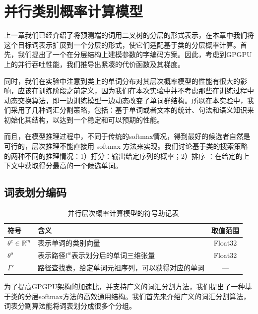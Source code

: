 \chapter{并行类别概率计算模型}
上一章我们已经介绍了将预测端的词用二叉树的分层的形式表示，在本章中我们将这个目标词表示扩展到一个分层的形式，使它们适配基于类的分层概率计算。首先，我们提出了一个在分层结构上建模参数的字编码方案。因此，考虑到GPGPU上的并行吞吐性能，我们推导出紧凑的代价函数及其梯度。

同时，我们在实验中注意到类上的单词分布对其层次概率模型的性能有很大的影响，应该在训练阶段之前定义，因为我们在本次实验中并不考虑那些在训练过程中动态交换算法，即一边训练模型一边动态改变了单词群结构。所以在本实验中，我们采用了几种词汇分割策略，包括：基于单词或者文本的统计、句法和语义知识来初始化其结构，以达到一个稳定和可以预期的性能。

而且，在模型推理过程中，不同于传统的softmax情况，得到最好的候选者自然是可行的，层次推理不能直接用 softmax 方法来实现。我们讨论基于类的搜索策略的两种不同的推理情况：1）打分：输出给定序列的概率；2）排序   ：在给定的上下文中获取得分最高的一个候选单词。


\section{词表划分编码}
\begin{table}[!ht]
  \centering
  \caption{并行层次概率计算模型的符号助记表}
\begin{tabular}{llc}
  \toprule
   符号&含义&取值范围\\ \midrule
$\theta^c\in\mathbb{R}^m$ &表示单词的类别向量& Float32\\
$ \theta^o$ &表示路径$l^w$表示划分后的单词三维张量&Float32 \\
$\Gamma'$ &路径查找表，给定单词元祖序列，可以获得对应的单词&--- \\
  \bottomrule
\end{tabular}
\end{table}
为了提高GPGPU架构的加速比，并支持广义的词汇分割方法，我们提出了一种基于类的分层softmax方法的高效通用结构。我们首先来介绍广义的词汇分割算法，词表分割算法能将词表划分成很多个分组。

